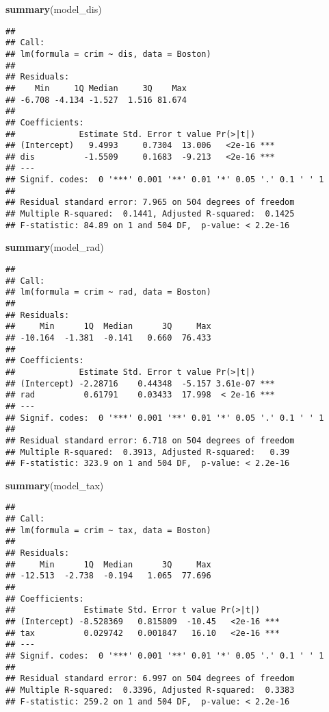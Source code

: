 \documentclass[
]{article}
\newenvironment{Shaded}{\begin{snugshade}}{\end{snugshade}}
\newcommand{\FunctionTok}[1]{\textcolor[rgb]{0.13,0.29,0.53}{\textbf{#1}}}
\newcommand{\NormalTok}[1]{#1}
\begin{document}
\begin{Shaded}
\begin{Highlighting}[]
\FunctionTok{summary}\NormalTok{(model\_dis)}
\end{Highlighting}
\end{Shaded}

\begin{verbatim}
## 
## Call:
## lm(formula = crim ~ dis, data = Boston)
## 
## Residuals:
##    Min     1Q Median     3Q    Max 
## -6.708 -4.134 -1.527  1.516 81.674 
## 
## Coefficients:
##             Estimate Std. Error t value Pr(>|t|)    
## (Intercept)   9.4993     0.7304  13.006   <2e-16 ***
## dis          -1.5509     0.1683  -9.213   <2e-16 ***
## ---
## Signif. codes:  0 '***' 0.001 '**' 0.01 '*' 0.05 '.' 0.1 ' ' 1
## 
## Residual standard error: 7.965 on 504 degrees of freedom
## Multiple R-squared:  0.1441, Adjusted R-squared:  0.1425 
## F-statistic: 84.89 on 1 and 504 DF,  p-value: < 2.2e-16
\end{verbatim}

\begin{Shaded}
\begin{Highlighting}[]
\FunctionTok{summary}\NormalTok{(model\_rad)}
\end{Highlighting}
\end{Shaded}

\begin{verbatim}
## 
## Call:
## lm(formula = crim ~ rad, data = Boston)
## 
## Residuals:
##     Min      1Q  Median      3Q     Max 
## -10.164  -1.381  -0.141   0.660  76.433 
## 
## Coefficients:
##             Estimate Std. Error t value Pr(>|t|)    
## (Intercept) -2.28716    0.44348  -5.157 3.61e-07 ***
## rad          0.61791    0.03433  17.998  < 2e-16 ***
## ---
## Signif. codes:  0 '***' 0.001 '**' 0.01 '*' 0.05 '.' 0.1 ' ' 1
## 
## Residual standard error: 6.718 on 504 degrees of freedom
## Multiple R-squared:  0.3913, Adjusted R-squared:   0.39 
## F-statistic: 323.9 on 1 and 504 DF,  p-value: < 2.2e-16
\end{verbatim}

\begin{Shaded}
\begin{Highlighting}[]
\FunctionTok{summary}\NormalTok{(model\_tax)}
\end{Highlighting}
\end{Shaded}

\begin{verbatim}
## 
## Call:
## lm(formula = crim ~ tax, data = Boston)
## 
## Residuals:
##     Min      1Q  Median      3Q     Max 
## -12.513  -2.738  -0.194   1.065  77.696 
## 
## Coefficients:
##              Estimate Std. Error t value Pr(>|t|)    
## (Intercept) -8.528369   0.815809  -10.45   <2e-16 ***
## tax          0.029742   0.001847   16.10   <2e-16 ***
## ---
## Signif. codes:  0 '***' 0.001 '**' 0.01 '*' 0.05 '.' 0.1 ' ' 1
## 
## Residual standard error: 6.997 on 504 degrees of freedom
## Multiple R-squared:  0.3396, Adjusted R-squared:  0.3383 
## F-statistic: 259.2 on 1 and 504 DF,  p-value: < 2.2e-16
\end{verbatim}
\end{document}
